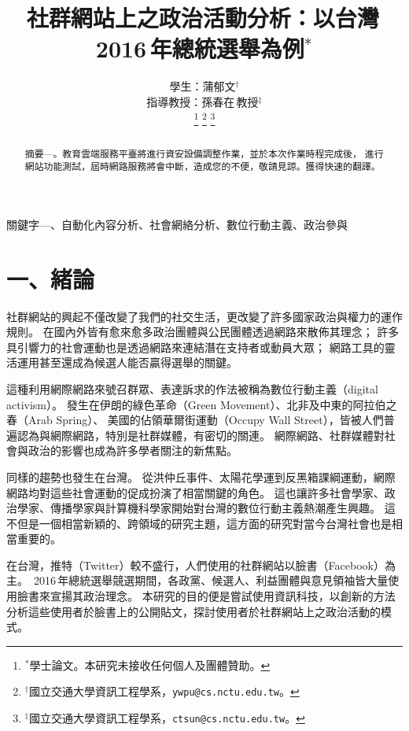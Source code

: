 \documentclass[letterpaper, 10pt, conference]{ieeeconf}   %
\title{\LARGE \bf
社群網站上之政治活動分析：以台灣\,2016\,年總統選舉為例$^{\ast}$
}
\author{\parbox{3 in}{\centering 學生：蒲郁文$^{\dagger}$}
        \hspace*{0.5 in}
        \parbox{3 in}{\centering 指導教授：孫春在\,教授$^{\ddagger}$}
        \thanks{$^{\ast}$學士論文。本研究未接收任何個人及團體贊助。}
        \thanks{$^{\dagger}$國立交通大學資訊工程學系，{\tt\small ywpu@cs.nctu.edu.tw}。}
        \thanks{$^{\ddagger}$國立交通大學資訊工程學系，{\tt\small ctsun@cs.nctu.edu.tw}。}
}
\begin{document}
\begin{CJK*}{UTF8}{bsmi}
\onehalfspacing

\maketitle
\thispagestyle{empty}
\pagestyle{empty}


\begin{abstract}
摘要\enskip---。教育雲端服務平臺將進行資安設備調整作業，並於本次作業時程完成後，
進行網站功能測試，屆時網路服務將會中斷，造成您的不便，敬請見諒。獲得快速的翻譯。
\end{abstract}

\begin{keywords}
關鍵字\enskip---、自動化內容分析、社會網絡分析、數位行動主義、政治參與
\end{keywords}


\section*{一、緒論}

社群網站的興起不僅改變了我們的社交生活，更改變了許多國家政治與權力的運作規則。
在國內外皆有愈來愈多政治團體與公民團體透過網路來散佈其理念；
許多具引響力的社會運動也是透過網路來連結潛在支持者或動員大眾；
網路工具的靈活運用甚至還成為候選人能否贏得選舉的關鍵。

這種利用網際網路來號召群眾、表達訴求的作法被稱為數位行動主義（digital activism）。
發生在伊朗的綠色革命（Green Movement）、北非及中東的阿拉伯之春（Arab Spring）、
美國的佔領華爾街運動（Occupy Wall Street），皆被人們普遍認為與網際網路，特別是社群媒體，有密切的關連。
網際網路、社群媒體對社會與政治的影響也成為許多學者關注的新焦點。

同樣的趨勢也發生在台灣。
從洪仲丘事件、太陽花學運到反黑箱課綱運動，網際網路均對這些社會運動的促成扮演了相當關鍵的角色。
這也讓許多社會學家、政治學家、傳播學家與計算機科學家開始對台灣的數位行動主義熱潮產生興趣。
這不但是一個相當新穎的、跨領域的研究主題，這方面的研究對當今台灣社會也是相當重要的。

在台灣，推特（Twitter）較不盛行，人們使用的社群網站以臉書（Facebook）為主。
\,2016\,年總統選舉競選期間，各政黨、候選人、利益團體與意見領袖皆大量使用臉書來宣揚其政治理念。
本研究的目的便是嘗試使用資訊科技，以創新的方法分析這些使用者於臉書上的公開貼文，探討使用者於社群網站上之政治活動的模式。


\end{CJK*}
\end{document}

